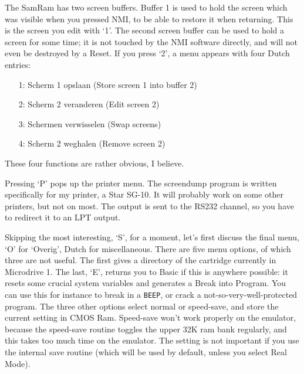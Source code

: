     The SamRam has two screen buffers.  Buffer 1 is used to hold the screen
    which was visible when you pressed NMI, to be able to restore it when
    returning.  This is the screen you edit with `1'.  The second screen
    buffer can be used to hold a screen for some time; it is not touched by
    the NMI software directly, and will not even be destroyed by a Reset. If
    you press `2', a menu appears with four Dutch entries:
\begin{itemize}
  \item[1:] Scherm 1 opslaan        (Store screen 1 into buffer 2)
  \item[2:] Scherm 2 veranderen     (Edit screen 2)
  \item[3:] Schermen verwisselen    (Swap screens)
  \item[4:] Scherm 2 weghalen       (Remove screen 2)
\end{itemize}
    These four functions are rather obvious, I believe.

    Pressing `P' pops up the printer menu.  The screendump program is
    written specifically for my printer, a Star SG-10.  It will probably
    work on some other printers, but not on most.  The output is sent to the
    RS232 channel, so you have to redirect it to an LPT output.

    Skipping the most interesting, `S', for a moment, let's first discuss
    the final menu, `O' for `Overig', Dutch for miscellaneous.  There are
    five menu options, of which three are not useful.  The first gives a
    directory of the cartridge currently in Microdrive 1.  The last, `E',
    returns you to Basic if this is anywhere possible: it resets some
    crucial system variables and generates a Break into Program.  You can
    use this for instance to break in a \verb|BEEP|, or crack a
    not-so-very-well-protected program.
    The three other options select normal or speed-save, and store
    the current setting in CMOS Ram.  Speed-save won't work
    properly on the emulator, because the speed-save routine toggles the
    upper 32K ram bank regularly, and this takes too much time on the
    emulator.  The setting is not important if you use the internal save
    routine (which will be used by default, unless you select Real Mode).

